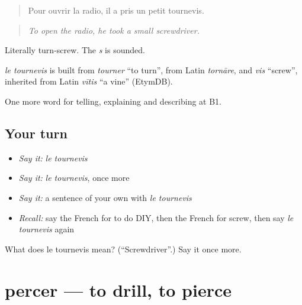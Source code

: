 \begin{quote}
Pour ouvrir la radio, il a pris un petit tournevis.
\end{quote}

\begin{quote}
\emph{To open the radio, he took a small screwdriver.}
\end{quote}

Literally turn-screw. The \emph{s} is sounded.

\begin{cousinweb}
\emph{le tournevis} is built from \emph{tourner} \textquotedblleft{}to turn\textquotedblright{}, from Latin \emph{tornāre}, and \emph{vis} \textquotedblleft{}screw\textquotedblright{}, inherited from Latin \emph{vītis} \textquotedblleft{}a vine\textquotedblright{} (EtymDB).
\end{cousinweb}

\begin{grammarlens}[title={What you've built}]
One more word for telling, explaining and describing at B1.
\end{grammarlens}

\subsection*{Your turn}
\begin{itemize}
\raggedright
  \item \emph{Say it:} \emph{le tournevis}
  \item \emph{Say it:} \emph{le tournevis}, once more
  \item \emph{Say it:} a sentence of your own with \emph{le tournevis}
  \item \emph{Recall:} say the French for to do DIY, then the French for screw, then say \emph{le tournevis} again
\end{itemize}

\begin{tcolorbox}[breakable,colback=teal!4,colframe=teal!35!black,title={Before you move on}]
What does le tournevis mean? (\textquotedblleft{}Screwdriver\textquotedblright{}.) Say it once more.
\end{tcolorbox}
\section[percer]{percer — to drill, to pierce}

\label{lesson:FR-C531-percer}



